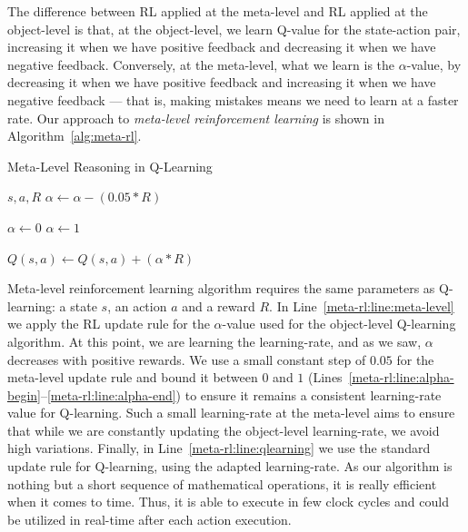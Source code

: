 The difference between RL applied at the meta-level and RL applied at the object-level is that, at the object-level, we learn Q-value for the state-action pair, increasing it when we have positive feedback and decreasing it when we have negative feedback. 
Conversely, at the meta-level, what we learn is the $\alpha$-value, by decreasing it when we have positive feedback and increasing it when we have negative feedback --- that is, making mistakes means we need to learn at a faster rate. 
Our approach to \textit{meta-level reinforcement learning} is shown in Algorithm~\ref{alg:meta-rl}. 

\begin{algorithm}
	\caption{Meta-Level Reasoning in Q-Learning}
	\label{alg:meta-rl} 
	\begin{algorithmic}[1]
		\REQUIRE $s, a, R$
		\STATE $\alpha \gets \alpha - (0.05 * R)$ \label{meta-rl:line:meta-level}
		\item[]
		 \label{meta-rl:line:alpha-begin}
			\STATE $\alpha \gets 0$
		\ENDIF
			\STATE $\alpha \gets 1$
		\ENDIF \label{meta-rl:line:alpha-end}
		\item[]
		\STATE $Q(s,a) \gets Q(s,a) + (\alpha * R)$ \label{meta-rl:line:qlearning}
	\end{algorithmic}
\end{algorithm}

Meta-level reinforcement learning algorithm requires the same parameters as Q-learning:
a state $s$, an action $a$ and a reward $R$.
In Line~\ref{meta-rl:line:meta-level} we apply the RL update rule for the $\alpha$-value used for the object-level Q-learning algorithm. 
At this point, we are learning the learning-rate, and as we saw, $\alpha$ decreases with positive rewards. 
We use a small constant step of $0.05$ for the meta-level update rule and bound it between $0$ and $1$ (Lines~\ref{meta-rl:line:alpha-begin}--\ref{meta-rl:line:alpha-end}) to ensure it remains a consistent learning-rate value for Q-learning. 
Such a small learning-rate at the meta-level aims to ensure that while we are constantly updating the object-level learning-rate, we avoid high variations. 
Finally, in Line~\ref{meta-rl:line:qlearning} we use the standard update rule for Q-learning,
using the adapted learning-rate. 
As our algorithm is nothing but a short sequence of mathematical operations, it is really efficient when it comes to time. 
Thus, it is able to execute in few clock cycles and could be utilized in real-time after each action execution.



